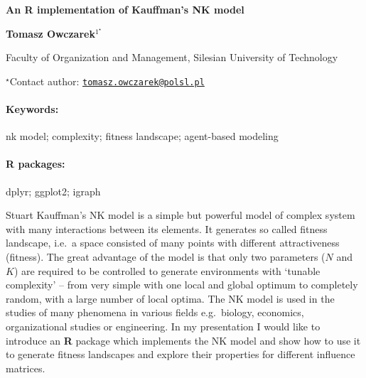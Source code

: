 \documentclass[11pt, a4paper]{article}
\renewcommand{\title}[1]{\begin{center}{\bf \LARGE #1}\end{center}}
\newcommand{\keywords}{\paragraph{Keywords:}}
\newcommand{\packages}{\paragraph{R packages:}}
\begin{document}
\pagestyle{empty}

\title{An R implementation of Kauffman's NK model}

\begin{center}
  {\bf Tomasz Owczarek$^{1^\star}$}
\end{center}

\vskip 0.3cm

\begin{affiliations}
\begin{enumerate}
\begin{minipage}{0.915\textwidth}
\centering
\item Faculty of Organization and Management, Silesian University of
Technology \\[-2pt]
\end{minipage}
\end{enumerate}
$^\star$Contact author: \href{mailto:tomasz.owczarek@polsl.pl}{\nolinkurl{tomasz.owczarek@polsl.pl}}\\
\end{affiliations}

\vskip 0.5cm

\begin{minipage}{0.915\textwidth}
\keywords nk model; complexity; fitness landscape; agent-based modeling
\packages dplyr; ggplot2; igraph
\end{minipage}

\vskip 0.8cm

Stuart Kauffman's NK model is a simple but powerful model of complex
system with many interactions between its elements. It generates so
called fitness landscape, i.e.~a space consisted of many points with
different attractiveness (fitness). The great advantage of the model is
that only two parameters (\(N\) and \(K\)) are required to be controlled
to generate environments with `tunable complexity' -- from very simple
with one local and global optimum to completely random, with a large
number of local optima. The NK model is used in the studies of many
phenomena in various fields e.g.~biology, economics, organizational
studies or engineering. In my presentation I would like to introduce an
\textbf{R} package which implements the NK model and show how to use it
to generate fitness landscapes and explore their properties for
different influence matrices.
\end{document}
